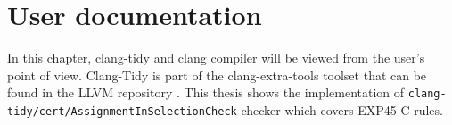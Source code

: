 
\chapter{User documentation}

In this chapter, clang-tidy and clang compiler will be viewed from the user's point of view. Clang-Tidy is part of the clang-extra-tools toolset that can be found in the LLVM repository \cite{clang-tidy-source}. This thesis shows the implementation of 
\lstinline{clang-tidy/cert/AssignmentInSelectionCheck} checker which covers EXP45-C rules.

 
